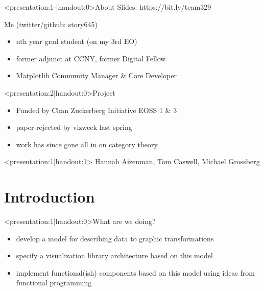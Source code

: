 \documentclass[xcolor={dvipsnames}]{beamer}
\begin{document}
\begin{frame}<presentation:1-|handout:0>{About}
    Slides: https://bit.ly/team329
    \begin{block}{Me (twitter/github: story645)}
        \begin{itemize}
            \item nth year grad student (on my 3rd EO)
            \item former adjunct at CCNY, former Digital Fellow
            \item Matplotlib Community Manager \& Core Developer
        \end{itemize}
    \end{block}

    \begin{block}<presentation:2|handout:0>{Project}
        \begin{itemize}
            \item Funded by Chan Zuckerberg Initiative EOSS 1 \& 3
            \item paper rejected by vizweek last spring
            \item work has since gone all in on category theory 
        \end{itemize}
    \end{block}
\end{frame}

\begin{frame}<presentation:1|handout:1>
	\titlepage
    Hannah Aizenman, Tom Caswell, Michael Grossberg\\
\end{frame}

\section{Introduction}
\begin{frame}<presentation:1|handout:0>{What are we doing?}
    \begin{itemize}
        \item develop a model for describing data to graphic transformations
        \item specify a visualization library architecture based on this model
        \item implement functional(ish) components based on this model using ideas from functional programming
    \end{itemize}
\end{frame}
\end{document}
